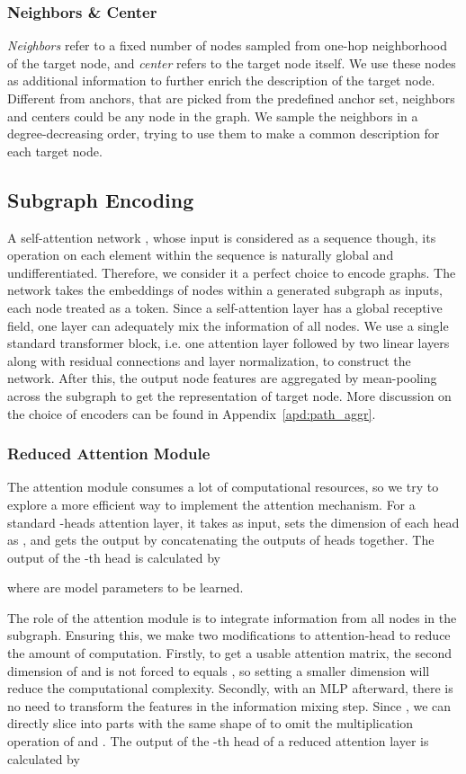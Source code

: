 \documentclass{article}
\begin{document}
\subsubsection{Neighbors \& Center}
\label{sec:nbors_center}
\emph{Neighbors} refer to a fixed number of nodes sampled from one-hop neighborhood of the target node, and \emph{center} refers to the target node itself. We use these nodes as additional information to further enrich the description of the target node. Different from anchors, that are picked from the predefined anchor set, neighbors and centers could be any node in the graph. We sample the neighbors in a degree-decreasing order, trying to use them to make a common description for each target node.

\subsection{Subgraph Encoding}
A self-attention network \cite{vaswani2017attention}, whose input is considered as a sequence though, its operation on each element within the sequence is naturally global and undifferentiated. Therefore, we consider it a perfect choice to encode graphs.
The network takes the embeddings of nodes within a generated subgraph as inputs, each node treated as a token. 
Since a self-attention layer has a global receptive field, one layer can adequately mix the information of all nodes. We use a single standard transformer block, i.e. one attention layer followed by two linear layers along with residual connections and layer normalization, to construct the network.
After this, the output node features are aggregated by mean-pooling across the subgraph to get the representation of target node. More discussion on the choice of encoders can be found in Appendix~\ref{apd:path_aggr}.

\subsubsection{Reduced Attention Module}
\label{sec:reduced}
The attention module consumes a lot of computational resources, so we try to explore a more efficient way to implement the attention mechanism. For a standard -heads attention layer, it takes  as input, sets the dimension of each head as , and gets the output  by concatenating the outputs of  heads together. The output of the -th head  is calculated by

where  are model parameters to be learned.

The role of the attention module is to integrate information from all nodes in the subgraph. Ensuring this, we make two modifications to attention-head to reduce the amount of computation.
Firstly, to get a usable attention matrix, the second dimension of  and  is not forced to equals , so setting a smaller dimension  will reduce the computational complexity. Secondly, with an MLP afterward, there is no need to transform the features in the information mixing step. Since , we can directly slice  into  parts with the same shape of  to omit the multiplication operation of  and .
The output of the -th head  of a reduced attention layer is calculated by
\end{document}
